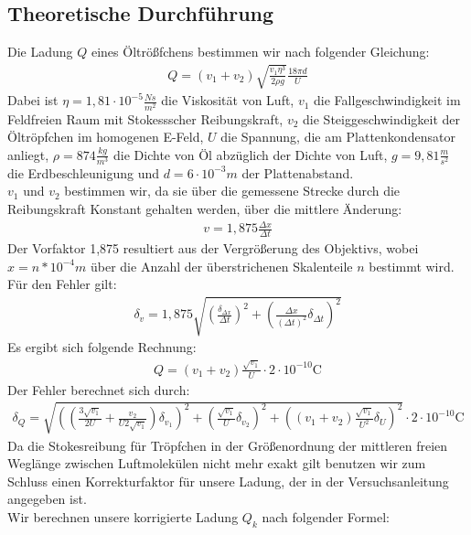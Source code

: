 \documentclass[12pt]{scrartcl}
\begin{document}
\subsection{Theoretische Durchführung}
Die Ladung $Q$ eines Öltrößfchens bestimmen wir nach folgender Gleichung:
\begin{align}
Q = (v_1+v_2)\sqrt{\frac{v_1 \eta^3}{2\rho g}} \frac{18 \pi d}{U}
\end{align}
Dabei ist $\eta = 1,81\cdot10^{-5}\frac{Ns}{m^2}$ die Viskosität von Luft, $v_1$ die Fallgeschwindigkeit im Feldfreien Raum mit Stokessscher Reibungskraft, $v_2$ die Steiggeschwindigkeit der Öltröpfchen im homogenen E-Feld, $U$ die Spannung, die am Plattenkondensator anliegt, $\rho = 874 \frac{kg}{m^3}$ die Dichte von Öl abzüglich der Dichte von Luft, $g = 9,81 \frac{m}{s^2}$ die Erdbeschleunigung und $ d = 6\cdot10^{-3} m$ der Plattenabstand.\\
$v_1$ und $v_2$ bestimmen wir, da sie über die gemessene Strecke durch die Reibungskraft Konstant gehalten werden, über die mittlere Änderung:
\begin{align}
v = 1,875\frac{\Delta x}{\Delta t}
\end{align}
Der Vorfaktor 1,875 resultiert aus der Vergrößerung des Objektivs, wobei $x = n*10^{-4}m$ über die Anzahl der überstrichenen Skalenteile $n$ bestimmt wird.\\
Für den Fehler gilt:
\begin{align}
\delta_v = 1,875 \sqrt{
\left(\frac{\delta_{\Delta x}}{\Delta t}\right)^2+
\left(\frac{\Delta x}{(\Delta t)^2}\delta_{\Delta t}\right)^2}
\end{align}
Es ergibt sich folgende Rechnung:
\begin{align}
Q = (v_1+v_2)\frac{\sqrt{v_1}}{U}\cdot2\cdot10^{-10} \text{C}
\end{align}
Der Fehler berechnet sich durch:
\begin{align}
\delta_Q = \sqrt{
\left(\left(\frac{3 \sqrt{v_1}}{2 U} + \frac{v_2}{U2\sqrt{v_1}}
\right)\delta_{v_1}\right)^2+
\left(\frac{\sqrt{v_1}}{U}\delta_{v_2}\right)^2+
\left((v_1+v_2)\frac{\sqrt{v_1}}{U^2}\delta_{U}\right)^2}
\cdot2\cdot10^{-10}\text{C}
\end{align}
Da die Stokesreibung für Tröpfchen in der Größenordnung der mittleren freien Weglänge zwischen Luftmolekülen nicht mehr exakt gilt benutzen wir zum Schluss einen Korrekturfaktor für unsere Ladung, der in der Versuchsanleitung angegeben ist.\\
Wir berechnen unsere korrigierte Ladung $Q_k$ nach folgender Formel:
\end{document}
